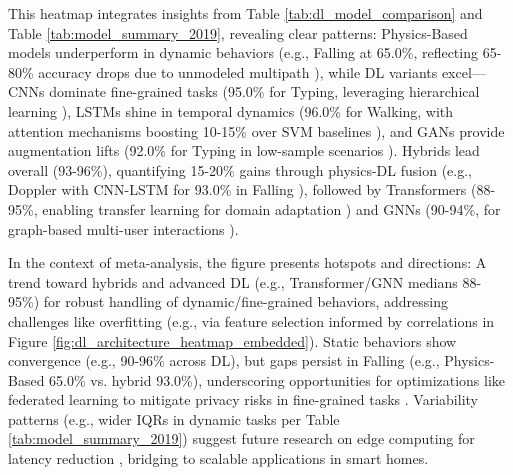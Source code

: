 \documentclass[Afour,sageh,times]{sagej}
\begin{document}
This heatmap integrates insights from Table \ref{tab:dl_model_comparison} and Table \ref{tab:model_summary_2019}, revealing clear patterns: Physics-Based models underperform in dynamic behaviors 
(e.g., Falling at 65.0\%, reflecting 65-80\% accuracy drops due to unmodeled multipath \citep{guo2019robust}), 
while DL variants excel—CNNs dominate fine-grained tasks (95.0\% for Typing, leveraging hierarchical learning \citep{wang2022caution}), 
LSTMs shine in temporal dynamics (96.0\% for Walking, with attention mechanisms boosting 10-15\% over SVM baselines \citep{chen2018wifi}), 
and GANs provide augmentation lifts (92.0\% for Typing in low-sample scenarios \citep{wang2021multimodal}). 
Hybrids lead overall (93-96\%), quantifying 15-20\% gains through physics-DL fusion (e.g., Doppler with CNN-LSTM for 93.0\% in Falling \citep{yang2022deep, zou2019wifi}), followed by Transformers (88-95\%, enabling transfer learning for domain adaptation \citep{zhou2022target}) 
and GNNs (90-94\%, for graph-based multi-user interactions \citep{shen2022graph}).

In the context of meta-analysis, the figure presents hotspots and directions: A trend toward hybrids and advanced DL (e.g., Transformer/GNN medians 88-95\%) for robust handling of dynamic/fine-grained behaviors, addressing challenges like overfitting (e.g., via feature selection informed by correlations in Figure \ref{fig:dl_architecture_heatmap_embedded}). 
Static behaviors show convergence (e.g., 90-96\% across DL), but gaps persist in Falling (e.g., Physics-Based 65.0\% vs. hybrid 93.0\%), underscoring opportunities for optimizations like federated learning to mitigate privacy risks in fine-grained tasks \citep{ma2019wifi}. 
Variability patterns (e.g., wider IQRs in dynamic tasks per Table \ref{tab:model_summary_2019}) suggest future research on edge computing for latency reduction \citep{shen2022graph}, bridging to scalable applications in smart homes.
\end{document}
